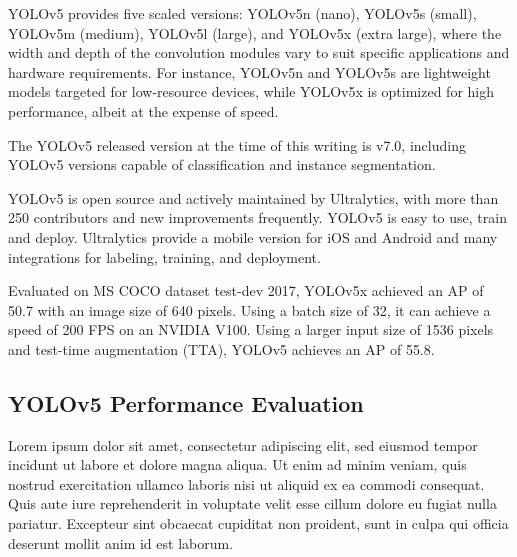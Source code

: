 \documentclass{article}
\begin{document}
YOLOv5 provides five scaled versions: YOLOv5n (nano), YOLOv5s (small), YOLOv5m (medium), YOLOv5l (large), and YOLOv5x (extra large), where the width and depth of the convolution modules vary to suit specific applications and hardware requirements. For instance, YOLOv5n and YOLOv5s are lightweight models targeted for low-resource devices, while YOLOv5x is optimized for high performance, albeit at the expense of speed.

The YOLOv5 released version at the time of this writing is v7.0, including YOLOv5 versions capable of classification and instance segmentation.

YOLOv5 is open source and actively maintained by Ultralytics, with more than 250 contributors and new improvements frequently. YOLOv5 is easy to use, train and deploy. Ultralytics provide a mobile version for iOS and Android and many integrations for labeling, training, and deployment.

Evaluated on MS COCO dataset test-dev 2017, YOLOv5x achieved an AP of 50.7 with an image size of 640 pixels. Using a batch size of 32, it can achieve a speed of 200 FPS on an NVIDIA V100. Using a larger input size of 1536 pixels and test-time augmentation (TTA), YOLOv5 achieves an AP of 55.8.

\subsection{YOLOv5 Performance Evaluation}


Lorem ipsum dolor sit amet, consectetur adipiscing elit, sed eiusmod tempor incidunt ut labore et dolore magna aliqua. Ut enim ad minim veniam, quis nostrud exercitation ullamco laboris nisi ut aliquid ex ea commodi consequat. Quis aute iure reprehenderit in voluptate velit esse cillum dolore eu fugiat nulla pariatur. Excepteur sint obcaecat cupiditat non proident, sunt in culpa qui officia deserunt mollit anim id est laborum.


\end{document}
